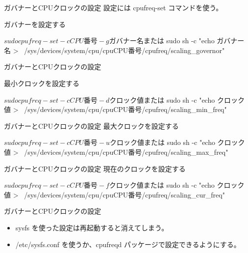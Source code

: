 \begin{frame}[containsverbatim]{ガバナーとCPUクロックの設定}
設定には cpufreq-set コマンドを使う。

ガバナーを設定する
\begin{commandline}
$ sudo cpufreq-set -c CPU番号 -g ガバナー名
または
$ sudo sh -c "echo ガバナー名 > \
  /sys/devices/system/cpu/cpuCPU番号/cpufreq/scaling_governor"
\end{commandline}

\end{frame}

\begin{frame}[containsverbatim]{ガバナーとCPUクロックの設定}

最小クロックを設定する
\begin{commandline}
$ sudo cpufreq-set -c CPU番号 -d クロック値
または
$ sudo sh -c "echo クロック値 > \
  /sys/devices/system/cpu/cpuCPU番号/cpufreq/scaling_min_freq"
\end{commandline}

\end{frame}

\begin{frame}[containsverbatim]{ガバナーとCPUクロックの設定}
最大クロックを設定する
\begin{commandline}
$ sudo cpufreq-set -c CPU番号 -u クロック値
または
$ sudo sh -c "echo クロック値 > \
  /sys/devices/system/cpu/cpuCPU番号/cpufreq/scaling_max_freq"
\end{commandline}

\end{frame}

\begin{frame}[containsverbatim]{ガバナーとCPUクロックの設定}
現在のクロックを設定する
\begin{commandline}
$ sudo cpufreq-set -c CPU番号 -f クロック値
または
$ sudo sh -c "echo クロック値 > \
  /sys/devices/system/cpu/cpuCPU番号/cpufreq/scaling_cur_freq"
\end{commandline}

\end{frame}

\begin{frame}{ガバナーとCPUクロックの設定}

\begin{itemize}
\item sysfs を使った設定は再起動すると消えてしまう。
\item /etc/sysfs.conf を使うか、cpufreqd パッケージで設定できるようにする。
\end{itemize}

\end{frame}

